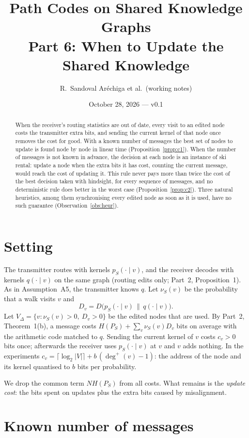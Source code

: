 \documentclass[11pt]{article}
\title{Path Codes on Shared Knowledge Graphs\\[2pt]\large Part 6: When to Update the Shared Knowledge}
\author{R.~Sandoval Ar\'echiga et al.\ (working notes)}
\date{October 28, 2026 --- v0.1}
\theoremstyle{definition}
\theoremstyle{remark}
\begin{document}
\maketitle

\begin{abstract}
When the receiver's routing statistics are out of date, every visit to an edited node costs the transmitter extra bits, and sending the current kernel of that node once removes the cost for good. With a known number of messages the best set of nodes to update is found node by node in linear time (Proposition~\ref{prop:c1}). When the number of messages is not known in advance, the decision at each node is an instance of ski rental: update a node when the extra bits it has cost, counting the current message, would reach the cost of updating it. This rule never pays more than twice the cost of the best decision taken with hindsight, for every sequence of messages, and no deterministic rule does better in the worst case (Proposition~\ref{prop:c2}). Three natural heuristics, among them synchronising every edited node as soon as it is used, have no such guarantee (Observation~\ref{obs:heur}).
\end{abstract}

\section{Setting}

The transmitter routes with kernels $p_S(\cdot\mid v)$, and the receiver decodes with kernels $q(\cdot\mid v)$ on the same graph (routing edits only; Part~2, Proposition~1). As in Assumption~A5, the transmitter knows $q$. Let $\nu_S(v)$ be the probability that a walk visits $v$ and
\[
D_v=D\bigl(p_S(\cdot\mid v)\,\big\|\,q(\cdot\mid v)\bigr).
\]
Let $V_\Delta=\{v:\nu_S(v)>0,\ D_v>0\}$ be the edited nodes that are used. By Part~2, Theorem~1(b), a message costs $H(P_S)+\sum_{v}\nu_S(v)D_v$ bits on average with the arithmetic code matched to $q$. Sending the current kernel of $v$ costs $c_v>0$ bits once; afterwards the receiver uses $p_S(\cdot\mid v)$ at $v$ and $v$ adds nothing. In the experiments $c_v=\lceil\log_2|V|\rceil+b\,(\deg^+(v)-1)$: the address of the node and its kernel quantised to $b$ bits per probability.

We drop the common term $NH(P_S)$ from all costs. What remains is the \emph{update cost}: the bits spent on updates plus the extra bits caused by misalignment.

\section{Known number of messages}
\end{document}
